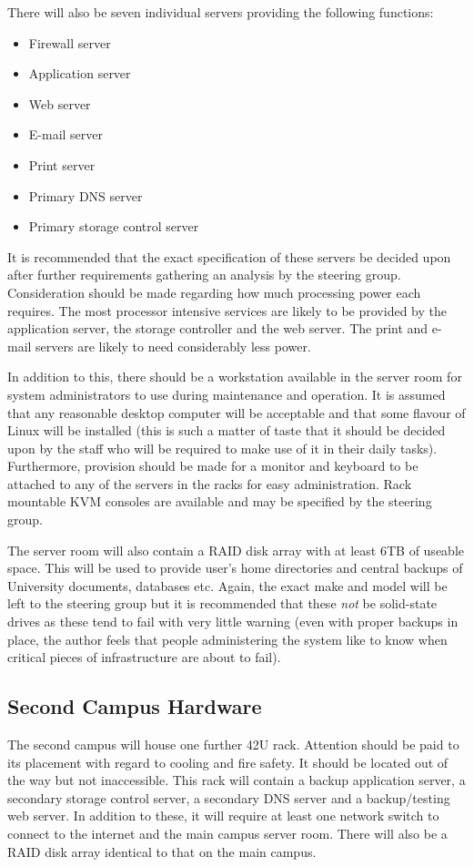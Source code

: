 \documentclass[a4paper, twoside]{article}
\begin{document}
There will also be seven individual servers providing the following functions:
\begin{itemize}
\item{Firewall server}
\item{Application server}
\item{Web server}
\item{E-mail server}
\item{Print server}
\item{Primary DNS server}
\item{Primary storage control server}
\end{itemize}
It is recommended that the exact specification of these servers be decided upon
after further requirements gathering an analysis by the steering group.
Consideration should be made regarding how much processing power each requires.
The most processor intensive services are likely to be provided by the
application server, the storage controller and the web server. The print and
e-mail servers are likely to need considerably less power.

In addition to this, there should be a workstation available in the server room
for system administrators to use during maintenance and operation. It is assumed
that any reasonable desktop computer will be acceptable and that some flavour of
Linux will be installed (this is such a matter of taste that it should be
decided upon by the staff who will be required to make use of it in their daily
tasks). Furthermore, provision should be made for a monitor and keyboard to be
attached to any of the servers in the racks for easy administration. Rack
mountable KVM consoles are available and may be specified by the steering group.

The server room will also contain a RAID disk array with at least 6TB of useable
space. This will be used to provide user's home directories and central backups
of University documents, databases etc. Again, the exact make and model will be
left to the steering group but it is recommended that these \emph{not} be
solid-state drives as these tend to fail with very little warning (even with
proper backups in place, the author feels that people administering the system
like to know when critical pieces of infrastructure are about to fail).

\subsection{Second Campus Hardware}
The second campus will house one further 42U rack. Attention should be paid to
its placement with regard to cooling and fire safety. It should be located out
of the way but not inaccessible. This rack will contain a backup application
server, a secondary storage control server, a secondary DNS server and a
backup/testing web server. In addition to these, it will require at least one
network switch to connect to the internet and the main campus server room. There
will also be a RAID disk array identical to that on the main campus.
\end{document}
